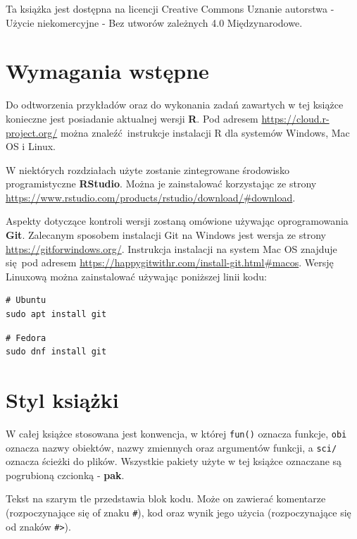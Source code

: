 \documentclass[paper=6in:9in,pagesize=pdftex,headinclude=on,footinclude=on,10pt]{scrbook}
\begin{document}
Ta książka jest dostępna na licencji Creative Commons Uznanie autorstwa - Użycie niekomercyjne - Bez utworów zależnych 4.0 Międzynarodowe.

\hypertarget{wymagania-wstepne}{%
\section*{Wymagania wstępne}\label{wymagania-wstepne}}

Do odtworzenia przykładów oraz do wykonania zadań zawartych w tej książce konieczne jest posiadanie aktualnej wersji \textbf{R}.
Pod adresem \url{https://cloud.r-project.org/} można znaleźć~instrukcje instalacji R dla systemów Windows, Mac OS i Linux.

W niektórych rozdziałach użyte zostanie zintegrowane środowisko programistyczne \textbf{RStudio}.
Można je zainstalować korzystając ze strony \url{https://www.rstudio.com/products/rstudio/download/\#download}.

Aspekty dotyczące kontroli wersji zostaną omówione używając oprogramowania \textbf{Git}.
Zalecanym sposobem instalacji Git na Windows jest wersja ze strony \url{https://gitforwindows.org/}.
Instrukcja instalacji na system Mac OS znajduje się~pod adresem \url{https://happygitwithr.com/install-git.html\#macos}.
Wersję Linuxową można zainstalować używając poniższej linii kodu:

\begin{verbatim}
# Ubuntu
sudo apt install git
\end{verbatim}

\begin{verbatim}
# Fedora
sudo dnf install git
\end{verbatim}

\hypertarget{styl-ksiazki}{%
\section*{Styl książki}\label{styl-ksiazki}}

W całej książce stosowana jest konwencja, w której \texttt{fun()} oznacza funkcje, \texttt{obi} oznacza nazwy obiektów, nazwy zmiennych oraz argumentów funkcji, a \texttt{sci/} oznacza ścieżki do plików.
Wszystkie pakiety użyte w tej książce oznaczane są pogrubioną czcionką - \textbf{pak}.

Tekst na szarym tle przedstawia blok kodu.
Może on zawierać komentarze (rozpoczynające się of znaku \texttt{\#}), kod oraz wynik jego użycia (rozpoczynające się od znaków \texttt{\#\textgreater{}}).
\end{document}

